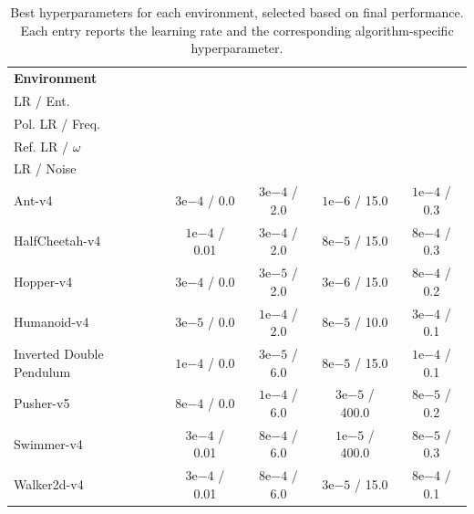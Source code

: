 \documentclass{article} %
\begin{document}
    \begin{table}[t]
    \centering
    \caption{Best hyperparameters for each environment, selected based on final performance.
    Each entry reports the learning rate and the corresponding algorithm-specific hyperparameter.}
    \label{table:best_results}
    \setlength{\tabcolsep}{5.5pt}
    \begin{tabular}{@{}lcccc@{}}
        \toprule
        \textbf{Environment}
        & \makecell{\textbf{PPO}\\[-1pt]\scriptsize LR / Ent.}
        & \makecell{\textbf{SAC}\\[-1pt]\scriptsize Pol. LR / Freq.}
        & \makecell{\textbf{\ourMethod}\\[-1pt]\scriptsize Ref. LR / $\omega$}
        & \makecell{\textbf{TD3}\\[-1pt]\scriptsize LR / Noise} \\
        \midrule
        Ant-v4
        & $3\mathrm{e}{-4}$ / 0.0
        & $3\mathrm{e}{-4}$ / 2.0
        & $1\mathrm{e}{-6}$ / 15.0
        & $1\mathrm{e}{-4}$ / 0.3 \\
        HalfCheetah-v4
        & $1\mathrm{e}{-4}$ / 0.01
        & $3\mathrm{e}{-4}$ / 2.0
        & $8\mathrm{e}{-5}$ / 15.0
        & $8\mathrm{e}{-4}$ / 0.3 \\
        Hopper-v4
        & $3\mathrm{e}{-4}$ / 0.0
        & $3\mathrm{e}{-5}$ / 2.0
        & $3\mathrm{e}{-6}$ / 15.0
        & $8\mathrm{e}{-4}$ / 0.2 \\
        Humanoid-v4
        & $3\mathrm{e}{-5}$ / 0.0
        & $1\mathrm{e}{-4}$ / 2.0
        & $8\mathrm{e}{-5}$ / 10.0
        & $3\mathrm{e}{-4}$ / 0.1 \\
        Inverted Double Pendulum
        & $1\mathrm{e}{-4}$ / 0.0
        & $3\mathrm{e}{-5}$ / 6.0
        & $8\mathrm{e}{-5}$ / 15.0
        & $1\mathrm{e}{-4}$ / 0.1 \\
        Pusher-v5
        & $8\mathrm{e}{-4}$ / 0.0
        & $1\mathrm{e}{-4}$ / 6.0
        & $3\mathrm{e}{-5}$ / 400.0
        & $8\mathrm{e}{-5}$ / 0.2 \\
        Swimmer-v4
        & $3\mathrm{e}{-4}$ / 0.01
        & $8\mathrm{e}{-4}$ / 6.0
        & $1\mathrm{e}{-5}$ / 400.0
        & $8\mathrm{e}{-5}$ / 0.3 \\
        Walker2d-v4
        & $3\mathrm{e}{-4}$ / 0.01
        & $8\mathrm{e}{-4}$ / 6.0
        & $3\mathrm{e}{-5}$ / 15.0
        & $8\mathrm{e}{-4}$ / 0.1 \\
        \bottomrule
    \end{tabular}
\end{table}
\end{document}
